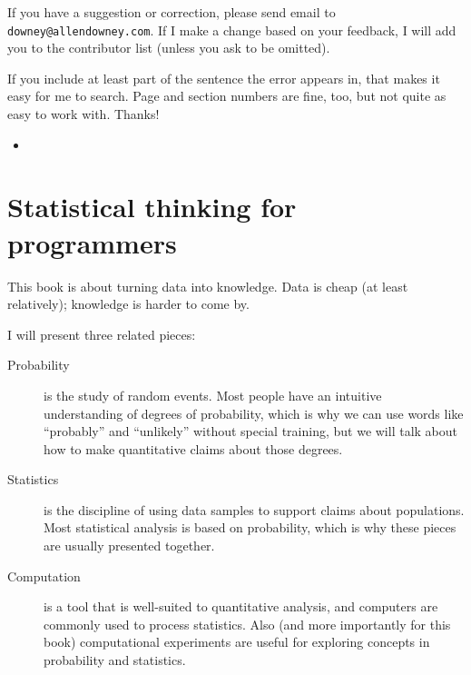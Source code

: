 \documentclass[10pt]{book}
\begin{document}

If you have a suggestion or correction, please send email to 
{\tt downey@allendowney.com}.  If I make a change based on your
feedback, I will add you to the contributor list
(unless you ask to be omitted).

If you include at least part of the sentence the
error appears in, that makes it easy for me to search.  Page and
section numbers are fine, too, but not quite as easy to work with.
Thanks!

\small

\begin{itemize}

\item 


\end{itemize}

\normalsize

\clearemptydoublepage

\begin{latexonly}

\tableofcontents

\clearemptydoublepage

\end{latexonly}

\mainmatter


\chapter{Statistical thinking for programmers}

This book is about turning data into knowledge.  Data is cheap (at
least relatively); knowledge is harder to come by.

I will present three related pieces:

\begin{description}

\item[Probability] is the study of random events.  Most people have an
  intuitive understanding of degrees of probability, which is why we
  can use words like ``probably'' and ``unlikely'' without special
  training, but we will talk about how to make quantitative claims
  about those degrees.

\item[Statistics] is the discipline of using data samples to support
  claims about populations.  Most statistical analysis is based on
  probability, which is why these pieces are usually presented
  together.

\item[Computation] is a tool that is well-suited to quantitative
  analysis, and computers are commonly used to process statistics.
  Also (and more importantly for this book) computational experiments
  are useful for exploring concepts in probability and statistics.

\end{description}
\end{document}
